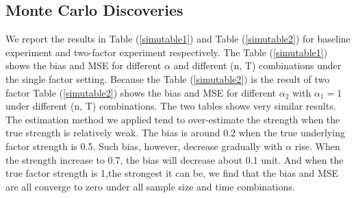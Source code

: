 \documentclass[12pt]{article}
\begin{document}
\subsection{Monte Carlo Discoveries}
We report the results in Table (\ref{simutable1}) and Table (\ref{simutable2}) for baseline experiment and two-factor experiment respectively.
The Table (\ref{simutable1}) shows the bias and MSE for different $\alpha$ and different (n, T) combinations under the single factor setting.
Because the Table (\ref{simutable2}) is the result of two factor 
Table (\ref{simutable2}) shows the bias and MSE for different $\alpha_2$ with $\alpha_1 = 1$ under different (n, T) combinations.
The two tables shows very similar results.
The estimation method we applied tend to over-estimate the strength when the true strength is relatively weak.
The bias is around 0.2 when the true underlying factor strength is 0.5.
Such bias, however, decrease gradually with $\alpha$ rise.
When the strength increase to 0.7, the bias will decrease about 0.1 unit.
And when the true factor strength is 1,the strongest it can be, we find that the bias and MSE are all converge to zero under all sample size and time combinations. 

\newpage



\newpage
\appendix



		
\end{document}
